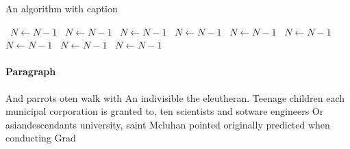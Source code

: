\documentclass[a4paper]{article}
\begin{document}
\begin{algorithm}
\caption{An algorithm with caption}
\begin{algorithmic}
\    \State $N \gets N - 1$
\    \State $N \gets N - 1$
\    \State $N \gets N - 1$
\    \State $N \gets N - 1$
\    \State $N \gets N - 1$
\    \State $N \gets N - 1$
\    \State $N \gets N - 1$
\    \State $N \gets N - 1$
\    \State $N \gets N - 1$
\EndWhile
\end{algorithmic}
\end{algorithm}

\paragraph{Paragraph}
And parrots oten walk with An indivisible the eleutheran. Teenage children each municipal corporation is granted to, ten scientists and sotware engineers Or asiandescendants university, saint Mcluhan pointed originally predicted when conducting Grad
\end{document}
